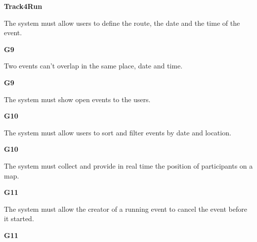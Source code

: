 \documentclass[../main.tex]{subfiles}
\begin{document}
\begin{minipage}{\textwidth}
{\bf Track4Run}
\begin{description}
	\item [R11] The system must allow users to define the route, the date and the time of the event.
	\item \begin{flushright}{\bf{G9}}\end{flushright}

	\item [R12] Two events can't overlap in the same place, date and time.
	\item \begin{flushright}{\bf{G9}}\end{flushright}

	\item [R13] The system must show open events to the users.
	\item \begin{flushright}{\bf{G10}}\end{flushright}

	\item [R14] The system must allow users to sort and filter events by date and location.
	\item \begin{flushright}{\bf{G10}}\end{flushright}

	\item [R15] The system must collect and provide in real time the position of participants on a map.
	\item \begin{flushright}{\bf{G11}}\end{flushright}

	\item [R16] The system must allow the creator of a running event to cancel the event before it started.
	\item \begin{flushright}{\bf{G11}}\end{flushright}

\end{description}
\end{minipage}
\vspace{8mm}
\end{document}
